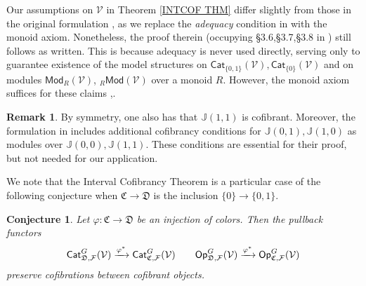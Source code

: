 \documentclass[a4paper,10pt
,draft
]{article}%
\numberwithin{equation}{section}
\numberwithin{figure}{section}
\newtheorem{conjecture}[equation]{Conjecture}%
\theoremstyle{definition} %
\newtheorem{remark}[equation]{Remark}%
\newcommand{\F}{\ensuremath{\mathcal F}}
\newcommand{\V}{\ensuremath{\mathcal V}}
\newcommand{\1}{\ensuremath{\mathbbm 1}}%
\begin{document}
Our assumptions on $\V$
in Theorem \ref{INTCOF THM} differ slightly
from those in the original formulation \cite[Thm. 1.15]{BM13},
as we replace the \emph{adequacy} condition in
\cite[Def. 1.1]{BM13} with the monoid axiom.
Nonetheless, the proof therein (occupying \S 3.6,\S 3.7,\S 3.8 in \cite{BM13}) still follows as written.
This is because adequacy is never used directly, 
serving only to guarantee existence of the 
model structures 
on $\mathsf{Cat}_{\{0,1\}}(\V),\mathsf{Cat}_{\{0\}}(\V)$
and 
on modules $\mathsf{Mod}_{R}(\V)$, $_R\mathsf{Mod}(\V)$
over a monoid $R$.
However, the monoid axiom suffices for these claims
\cite[Thm. 1.3]{Mur11},\cite[Thm. 4.1]{SS00}.



%



\begin{remark}
By symmetry, one also has that $\mathbb{J}(1,1)$ is cofibrant.
Moreover, the formulation in \cite[Thm. 1.15]{BM13}
includes additional cofibrancy conditions for
$\mathbb{J}(0,1),\mathbb{J}(1,0)$
as modules over $\mathbb{J}(0,0),\mathbb{J}(1,1)$.
These conditions are essential for their proof, 
but not needed for our application.
\end{remark}




We note that the Interval Cofibrancy Theorem is a particular case of the following conjecture when $\mathfrak{C} \to \mathfrak{D}$
is the inclusion $\{0\} \to \{0,1\}$.


\begin{conjecture}\label{CATOP CONJ}
Let $\varphi \colon \mathfrak{C} \to \mathfrak{D}$
be an injection of colors.
Then the pullback functors
\[
	\mathsf{Cat}_{\mathfrak{D},\F}^G(\V)
	\xrightarrow{\varphi^{\**}}
	\mathsf{Cat}_{\mathfrak{C},\F}^G(\V)
\qquad
	\mathsf{Op}_{\mathfrak{D},\F}^G(\V)
	\xrightarrow{\varphi^{\**}}
	\mathsf{Op}_{\mathfrak{C},\F}^G(\V)
\]
preserve cofibrations between cofibrant objects.
\end{conjecture}
\end{document}
